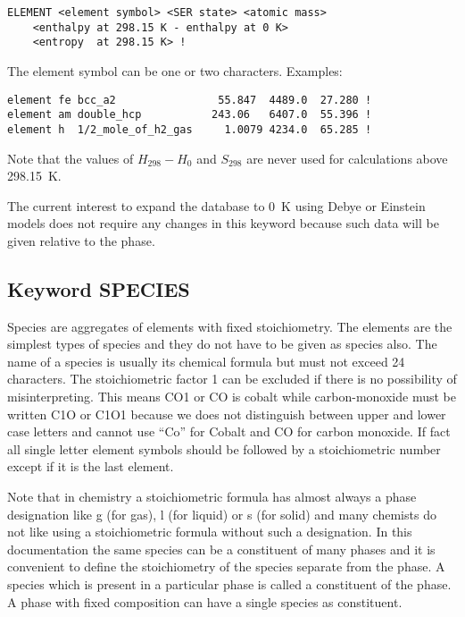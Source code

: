 \documentclass[12pt]{article}
\begin{document}
\begin{verbatim}
ELEMENT <element symbol> <SER state> <atomic mass>
    <enthalpy at 298.15 K - enthalpy at 0 K>
    <entropy  at 298.15 K> !
\end{verbatim}

The element symbol can be one or two characters.  Examples:

\begin{verbatim}
element fe bcc_a2                55.847  4489.0  27.280 !
element am double_hcp           243.06   6407.0  55.396 !
element h  1/2_mole_of_h2_gas     1.0079 4234.0  65.285 !
\end{verbatim}

Note that the values of $H_{298}-H_{0}$ and $S_{298}$ are never used
for calculations above 298.15~K.

The current interest to expand the database to 0~K using Debye or
Einstein models does not require any changes in this keyword because
such data will be given relative to the phase.

\subsection{Keyword SPECIES}

Species are aggregates of elements with fixed stoichiometry.  The
elements are the simplest types of species and they do not have to be
given as species also.  The name of a species is usually its chemical
formula but must not exceed 24 characters.  The stoichiometric factor
1 can be excluded if there is no possibility of misinterpreting.  This
means CO1 or CO is cobalt while carbon-monoxide must be written C1O or
C1O1 because we does not distinguish between upper and lower case
letters and cannot use ``Co'' for Cobalt and CO for carbon monoxide.
If fact all single letter element symbols should be followed by a
stoichiometric number except if it is the last element.

Note that in chemistry a stoichiometric formula has almost always a
phase designation like g (for gas), l (for liquid) or s (for solid)
and many chemists do not like using a stoichiometric formula without
such a designation.  In this documentation the same species can be a
constituent of many phases and it is convenient to define the
stoichiometry of the species separate from the phase.  A species which
is present in a particular phase is called a constituent of the phase.
A phase with fixed composition can have a single species as
constituent.
\end{document}
